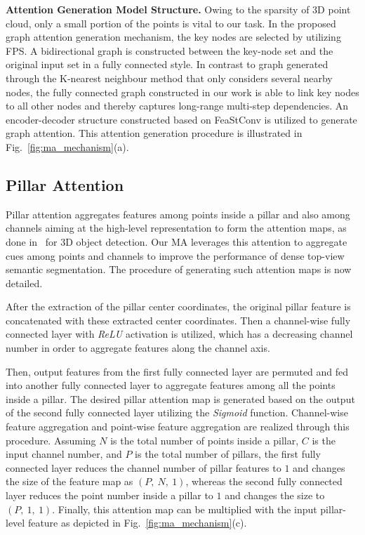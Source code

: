 \documentclass[lettersize,journal]{IEEEtran}
\begin{document}
\textbf{Attention Generation Model Structure.}
Owing to the sparsity of 3D point cloud, only a small portion of the points is vital to our task. In the proposed graph attention generation mechanism, the key nodes are selected by utilizing FPS. A bidirectional graph is constructed between the key-node set and the original input set in a fully connected style.
In contrast to graph generated through the K-nearest neighbour method that only considers several nearby nodes, the fully connected graph constructed in our work is able to link key nodes to all other nodes and thereby captures long-range multi-step dependencies.
An encoder-decoder structure constructed based on FeaStConv is utilized to generate graph attention. 
This attention generation procedure is illustrated in Fig.~\ref{fig:ma_mechanism}(a).

\subsection{Pillar Attention}
Pillar attention aggregates features among points inside a pillar and also among channels aiming at the high-level representation to form the attention maps, as done in~\cite{tanet} for 3D object detection.
Our MA leverages this attention to aggregate cues among points and channels to improve the performance of dense top-view semantic segmentation. 
The procedure of generating such attention maps is now detailed.

After the extraction of the pillar center coordinates, the original pillar feature is concatenated with these extracted center coordinates. Then a channel-wise fully connected layer with \emph{ReLU} activation is utilized, which has a decreasing channel number in order to aggregate features along the channel axis.

Then, output features from the first fully connected layer are permuted and fed into another fully connected layer to aggregate features among all the points inside a pillar. The desired pillar attention map is generated based on the output of the second fully connected layer utilizing the \emph{Sigmoid} function.
Channel-wise feature aggregation and point-wise feature aggregation are realized through this procedure. Assuming $N$ is the total number of points inside a pillar, $C$ is the input channel number, and $P$ is the total number of pillars, the first fully connected layer reduces the channel number of pillar features to $1$ and changes the size of the feature map as $(P,~N,~1)$, whereas the second fully connected layer reduces the point number inside a pillar to $1$ and changes the size to $(P,~1,~1)$. Finally, this attention map can be multiplied with the input pillar-level feature as depicted in Fig.~\ref{fig:ma_mechanism}(c).
 
\end{document}
